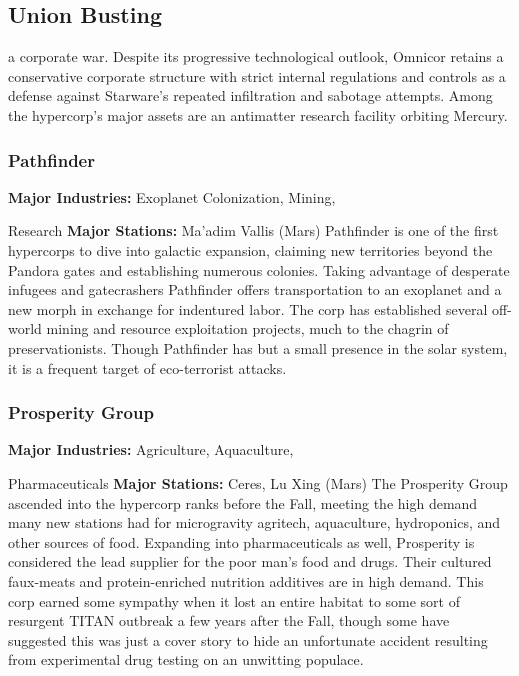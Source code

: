 \subsection{Union Busting}

a corporate war. Despite its progressive technological 
outlook, Omnicor retains a conservative corporate 
structure with strict internal regulations and controls 
as a defense against Starware's repeated infiltration and 
sabotage attempts. Among the hypercorp's major assets 
are an antimatter research facility orbiting Mercury.

\subsubsection{Pathfinder}

\textbf{Major Industries:} Exoplanet Colonization, Mining, 

Research
\textbf{Major Stations:} Ma'adim Vallis (Mars)
Pathfinder is one of the first hypercorps to dive into 
galactic expansion, claiming new territories beyond 
the Pandora gates and establishing numerous colonies. 
Taking advantage of desperate infugees and gatecrashers
Pathfinder offers transportation to an exoplanet
and a new morph in exchange for indentured labor. 
The corp has established several off-world mining and 
resource exploitation projects, much to the chagrin of 
preservationists. Though Pathfinder has but a small 
presence in the solar system, it is a frequent target of 
eco-terrorist attacks.

\subsubsection{Prosperity Group}

\textbf{Major Industries:} Agriculture, Aquaculture, 

Pharmaceuticals
\textbf{Major Stations:} Ceres, Lu Xing (Mars)
The Prosperity Group ascended into the hypercorp 
ranks before the Fall, meeting the high demand 
many new stations had for microgravity agritech, 
aquaculture, hydroponics, and other sources of food. 
Expanding into pharmaceuticals as well, Prosperity is 
considered the lead supplier for the poor man's food 
and drugs. Their cultured faux-meats and protein-enriched
nutrition additives are in high demand. This
corp earned some sympathy when it lost an entire 
habitat to some sort of resurgent TITAN outbreak a 
few years after the Fall, though some have suggested 
this was just a cover story to hide an unfortunate 
accident resulting from experimental drug testing on 
an unwitting populace.

